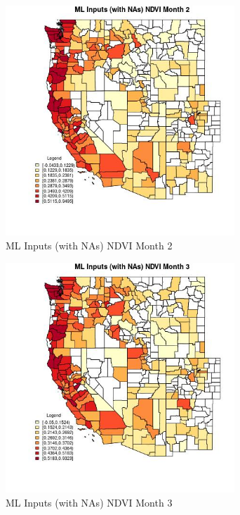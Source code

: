 \begin{figure} 
\centering  
\includegraphics[width=0.77\textwidth]{Code_Outputs/Report_ML_input_PM25_Step4_part_f_de_duplicated_aves_prioritize_24hr_obswNAs_CountyNDVImedianMonth2.jpg} 
\caption{\label{fig:Report_ML_input_PM25_Step4_part_f_de_duplicated_aves_prioritize_24hr_obswNAsCountyNDVImedianMonth2}ML Inputs (with NAs) NDVI Month 2} 
\end{figure} 
 

\begin{figure} 
\centering  
\includegraphics[width=0.77\textwidth]{Code_Outputs/Report_ML_input_PM25_Step4_part_f_de_duplicated_aves_prioritize_24hr_obswNAs_CountyNDVImedianMonth3.jpg} 
\caption{\label{fig:Report_ML_input_PM25_Step4_part_f_de_duplicated_aves_prioritize_24hr_obswNAsCountyNDVImedianMonth3}ML Inputs (with NAs) NDVI Month 3} 
\end{figure} 
 

